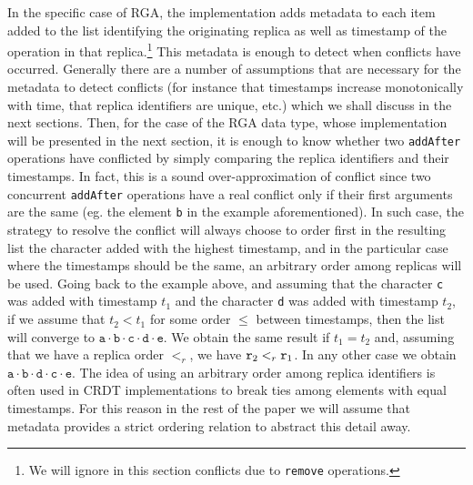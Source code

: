 

In the specific case of RGA, the implementation adds metadata to each
item added to the list identifying the originating replica as well as
timestamp of the operation in that replica.\footnote{We will ignore in
  this section conflicts due to \lstinline|remove| operations.}
%
This metadata is enough to detect when conflicts have occurred.
%
Generally there are a number of assumptions that are necessary for the
metadata to detect conflicts (for instance that timestamps increase
monotonically with time, that replica identifiers are unique, etc.)
which we shall discuss in the next sections.
%
Then, for the case of the RGA data type, whose implementation will be
presented in the next section, it is enough to know whether
two \lstinline|addAfter| operations have conflicted by simply
comparing the replica identifiers and their timestamps.
%
In fact, this is a sound over-approximation of conflict since two
concurrent \lstinline|addAfter| operations have a real conflict only
if their first arguments are the same (eg. the element \lstinline|b|
in the example aforementioned).
%
In such case, the strategy to resolve the conflict will always choose
to order first in the resulting list the character added with the
highest timestamp, and in the particular case where the timestamps
should be the same, an arbitrary order among replicas will be used.
%
Going back to the example above, and assuming that the character
\lstinline|c| was added with timestamp $t_1$ and the character
\lstinline|d| was added with timestamp $t_2$, if we assume that
$t_2 < t_1$ for some order $\leq$ between timestamps, then the list will
converge to $\mathtt{a \cdot b \cdot c \cdot d \cdot e}$.
%
We obtain the same result if $t_1 = t_2$ and, assuming that we have a replica
order $<_r$, we have $\mathtt{r}_2 <_r \mathtt{r}_1$.
%
In any other case we obtain $\mathtt{a \cdot b \cdot d \cdot c \cdot e}$.
%
The idea of using an arbitrary order among replica identifiers is
often used in CRDT implementations to break ties among elements with
equal timestamps.
%
For this reason in the rest of the paper we will assume that metadata
provides a strict ordering relation to abstract this detail away.

